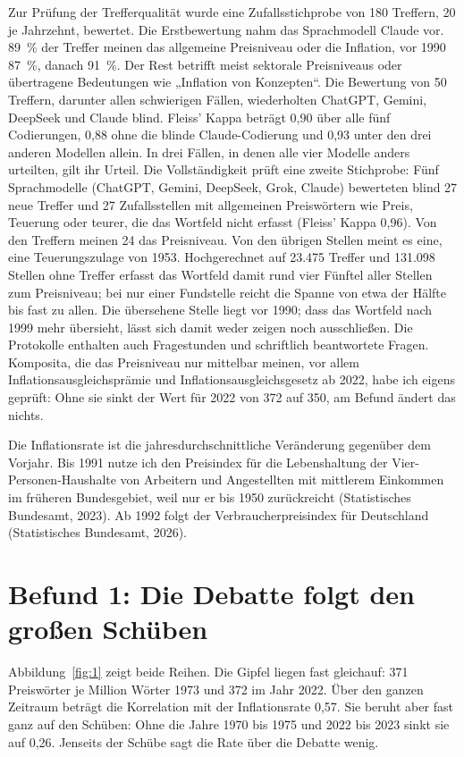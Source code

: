 \documentclass[11pt,a4paper]{article}
\begin{document}
Zur Prüfung der Trefferqualität wurde eine Zufallsstichprobe von 180 Treffern, 20 je Jahrzehnt, bewertet. Die Erstbewertung nahm das Sprachmodell Claude vor. 89~\% der Treffer meinen das allgemeine Preisniveau oder die Inflation, vor 1990 87~\%, danach 91~\%. Der Rest betrifft meist sektorale Preisniveaus oder übertragene Bedeutungen wie „Inflation von Konzepten“. Die Bewertung von 50 Treffern, darunter allen schwierigen Fällen, wiederholten ChatGPT, Gemini, DeepSeek und Claude blind. Fleiss' Kappa beträgt 0,90 über alle fünf Codierungen, 0,88 ohne die blinde Claude-Codierung und 0,93 unter den drei anderen Modellen allein. In drei Fällen, in denen alle vier Modelle anders urteilten, gilt ihr Urteil. Die Vollständigkeit prüft eine zweite Stichprobe: Fünf Sprachmodelle (ChatGPT, Gemini, DeepSeek, Grok, Claude) bewerteten blind 27 neue Treffer und 27 Zufallsstellen mit allgemeinen Preiswörtern wie Preis, Teuerung oder teurer, die das Wortfeld nicht erfasst (Fleiss' Kappa 0,96). Von den Treffern meinen 24 das Preisniveau. Von den übrigen Stellen meint es eine, eine Teuerungszulage von 1953. Hochgerechnet auf 23.475 Treffer und 131.098 Stellen ohne Treffer erfasst das Wortfeld damit rund vier Fünftel aller Stellen zum Preisniveau; bei nur einer Fundstelle reicht die Spanne von etwa der Hälfte bis fast zu allen. Die übersehene Stelle liegt vor 1990; dass das Wortfeld nach 1999 mehr übersieht, lässt sich damit weder zeigen noch ausschließen. Die Protokolle enthalten auch Fragestunden und schriftlich beantwortete Fragen. Komposita, die das Preisniveau nur mittelbar meinen, vor allem Inflationsausgleichsprämie und Inflationsausgleichsgesetz ab 2022, habe ich eigens geprüft: Ohne sie sinkt der Wert für 2022 von 372 auf 350, am Befund ändert das nichts.

Die Inflationsrate ist die jahresdurchschnittliche Veränderung gegenüber dem Vorjahr. Bis 1991 nutze ich den Preisindex für die Lebenshaltung der Vier-Personen-Haushalte von Arbeitern und Angestellten mit mittlerem Einkommen im früheren Bundesgebiet, weil nur er bis 1950 zurückreicht (Statistisches Bundesamt, 2023). Ab 1992 folgt der Verbraucherpreisindex für Deutschland (Statistisches Bundesamt, 2026).

\section{Befund 1: Die Debatte folgt den großen Schüben}

Abbildung~\ref{fig:1} zeigt beide Reihen. Die Gipfel liegen fast gleichauf: 371 Preiswörter je Million Wörter 1973 und 372 im Jahr 2022. Über den ganzen Zeitraum beträgt die Korrelation mit der Inflationsrate 0,57. Sie beruht aber fast ganz auf den Schüben: Ohne die Jahre 1970 bis 1975 und 2022 bis 2023 sinkt sie auf 0,26. Jenseits der Schübe sagt die Rate über die Debatte wenig.
\end{document}
